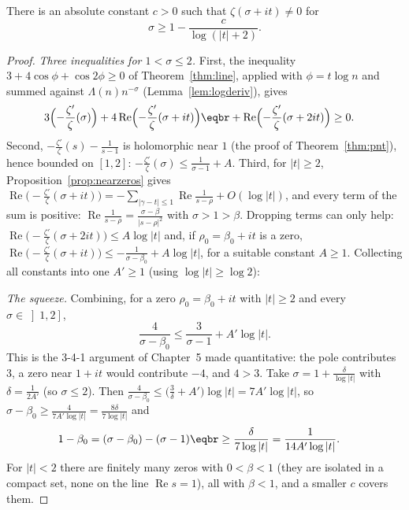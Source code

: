 \begin{theorem}\label{thm:zerofree}
There is an absolute constant $c>0$ such that $\zeta(\sigma+it)\ne0$ for
\[
\sigma\ge1-\frac c{\log(|t|+2)}.
\]
\end{theorem}
\begin{proof}
\emph{Three inequalities for $1<\sigma\le2$.} First, the inequality $3+4\cos\phi+\cos2\phi\ge0$ of Theorem~\ref{thm:line}, applied with $\phi=t\log n$ and summed against $\Lambda(n)n^{-\sigma}$
(Lemma~\ref{lem:logderiv}), gives
\[
\begin{aligned}3\Bigl(-\frac{\zeta'}\zeta(\sigma)\Bigr)&+4\operatorname{Re}\Bigl(-\frac{\zeta'}\zeta(\sigma+it)\Bigr)\eqbr+\operatorname{Re}\Bigl(-\frac{\zeta'}\zeta(\sigma+2it)\Bigr)\ge0.\end{aligned}
\]
Second, $-\frac{\zeta'}\zeta(s)-\frac1{s-1}$ is holomorphic near $1$ (the proof of Theorem~\ref{thm:pnt}), hence bounded on $[1,2]$: $-\frac{\zeta'}\zeta(\sigma)\le\frac1{\sigma-1}+A$. Third, for $|t|\ge2$,
Proposition~\ref{prop:nearzeros} gives $\operatorname{Re}\bigl(-\frac{\zeta'}\zeta(\sigma+it)\bigr)=-\sum_{|\gamma-t|\le1}\operatorname{Re}\frac1{s-\rho}+O(\log|t|)$, and every term of the sum is positive: $\operatorname{Re}\frac1{s-\rho}=\frac{\sigma-\beta}{|s-\rho|^2}$
with $\sigma>1>\beta$. Dropping terms can only help: $\operatorname{Re}\bigl(-\frac{\zeta'}\zeta(\sigma+2it)\bigr)\le A\log|t|$ and, if $\rho_0=\beta_0+it$ is a zero, $\operatorname{Re}\bigl(-\frac{\zeta'}\zeta(\sigma+it)\bigr)\le-\frac1{\sigma-\beta_0}+A\log|t|$,
for a suitable constant $A\ge1$. Collecting all constants into one $A'\ge1$ (using $\log|t|\ge\log2$):

\emph{The squeeze.} Combining, for a zero $\rho_0=\beta_0+it$ with $|t|\ge2$ and every $\sigma\in\left]1,2\right]$,
\[
\frac4{\sigma-\beta_0}\le\frac3{\sigma-1}+A'\log|t|.
\]
This is the 3-4-1 argument of Chapter~5 made quantitative: the pole contributes $3$, a zero near $1+it$ would contribute $-4$, and $4>3$. Take $\sigma=1+\frac\delta{\log|t|}$ with $\delta=\frac1{2A'}$
(so $\sigma\le2$). Then $\frac4{\sigma-\beta_0}\le\bigl(\frac3\delta+A'\bigr)\log|t|=7A'\log|t|$, so $\sigma-\beta_0\ge\frac4{7A'\log|t|}=\frac{8\delta}{7\log|t|}$ and
\[
\begin{aligned}1-\beta_0&=(\sigma-\beta_0)-(\sigma-1)\eqbr\ge\frac{\delta}{7\log|t|}=\frac1{14A'\log|t|}.\end{aligned}
\]
For $|t|<2$ there are finitely many zeros with $0<\beta<1$ (they are isolated in a compact set, none on the line $\operatorname{Re}s=1$), all with $\beta<1$, and a smaller $c$ covers them.
\end{proof}

